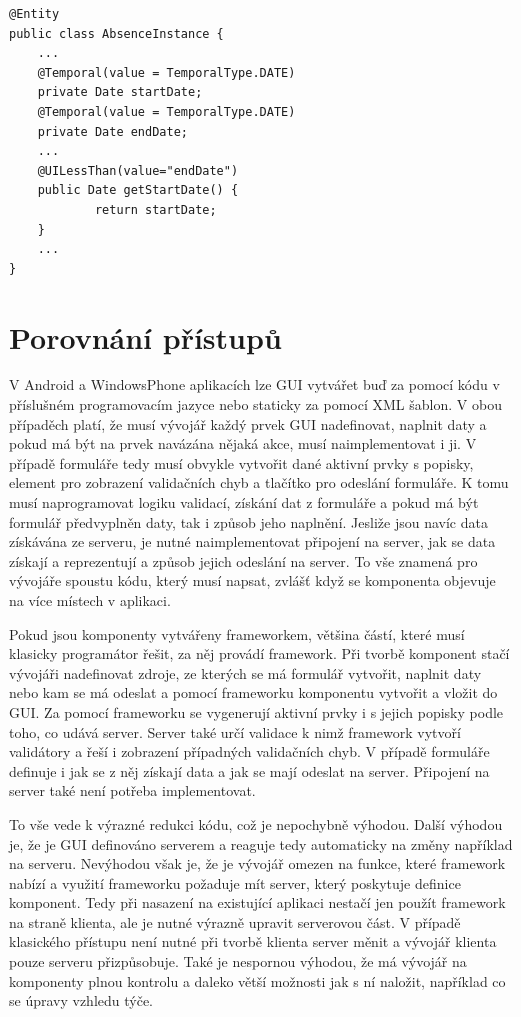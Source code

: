 \begin{lstlisting}[caption=Ukázka použití anotace @UILessThan,
label={code:uiLessThanUsage}, basicstyle=\footnotesize]
@Entity
public class AbsenceInstance {
	...
	@Temporal(value = TemporalType.DATE)
	private Date startDate;
	@Temporal(value = TemporalType.DATE)
	private Date endDate;
	...
	@UILessThan(value="endDate")
	public Date getStartDate() {
        	return startDate;
	}
	...
}
\end{lstlisting}

\section{Porovnání přístupů}
V Android a WindowsPhone aplikacích lze GUI vytvářet buď za pomocí kódu v příslušném programovacím jazyce nebo staticky za pomocí XML šablon. V obou případěch platí, že musí vývojář každý prvek GUI nadefinovat, naplnit daty a pokud má být na prvek navázána nějaká akce, musí naimplementovat i ji. V případě formuláře tedy musí obvykle vytvořit dané aktivní prvky s popisky, element pro zobrazení validačních chyb a tlačítko pro odeslání formuláře. K tomu musí naprogramovat logiku validací, získání dat z formuláře a pokud má být formulář předvyplněn daty, tak i způsob jeho naplnění. Jesliže jsou navíc data získávána ze serveru, je nutné naimplementovat připojení na server, jak se data získají a reprezentují a způsob jejich odeslání na server. To vše znamená pro vývojáře spoustu kódu, který musí napsat, zvlášť když se komponenta objevuje na více místech v aplikaci. 

Pokud jsou komponenty vytvářeny frameworkem, většina částí, které musí klasicky programátor řešit, za něj provádí framework. Při tvorbě komponent stačí vývojáři nadefinovat zdroje, ze kterých se má formulář vytvořit, naplnit daty nebo kam se má odeslat a pomocí frameworku komponentu vytvořit a vložit do GUI. Za pomocí frameworku se vygenerují aktivní prvky i s jejich popisky podle toho, co udává server. Server také určí validace k nimž framework vytvoří validátory a řeší i zobrazení případných validačních chyb. V případě formuláře definuje i jak se z něj získají data a jak se mají odeslat na server. Připojení na server také není potřeba implementovat. 

To vše vede k výrazné redukci kódu, což je nepochybně výhodou. Další výhodou je, že je GUI definováno serverem a reaguje tedy automaticky na změny například na serveru. Nevýhodou však je, že je vývojář omezen na funkce, které framework nabízí a využití frameworku požaduje mít server, který poskytuje definice komponent. Tedy při nasazení na existující aplikaci nestačí jen použít framework na straně klienta, ale je nutné výrazně upravit serverovou část. V případě klasického přístupu není nutné při tvorbě klienta server měnit a vývojář klienta pouze serveru přizpůsobuje. Také je nespornou výhodou, že má vývojář na komponenty plnou kontrolu a daleko větší možnosti jak s ní naložit, například co se úpravy vzhledu týče.
  